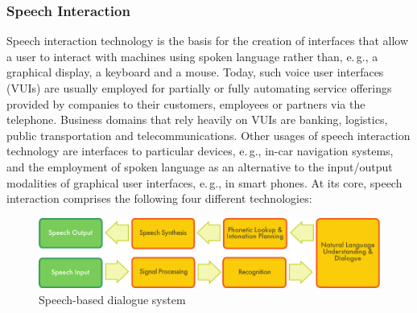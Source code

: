 \begin{multicols}{2}
\subsubsection{Speech Interaction}

Speech interaction technology is the basis for the creation of interfaces that allow a user to interact with machines using spoken language rather than, e.\,g., a graphical display, a keyboard and a mouse. Today, such voice user interfaces (VUIs) are usually employed for partially or fully automating service offerings provided by companies to their customers, employees or partners via the telephone. Business domains that rely heavily on VUIs are banking, logistics, public transportation and telecommunications. Other usages of speech interaction technology are interfaces to particular devices, e.\,g., in-car navigation systems, and the employment of spoken language as an alternative to the input/output modalities of graphical user interfaces, e.\,g., in smart phones. 
At its core, speech interaction comprises the following four different technologies:

\begin{figure}[htb]
  \center
  \includegraphics[width=\textwidth]{../_media/english/simple_speech-based_dialogue_architecture}
  \caption{Speech-based dialogue system}
  \label{fig:dialoguearch_en}
\end{figure}


\end{multicols}

